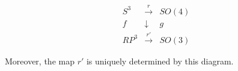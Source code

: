 $$\begin{array}{ccc}
S^3 & \xrightarrow{r} & SO(4) \\
f & \downarrow & g \\
RP^3 & \xrightarrow{r'} & SO(3)
\end{array}$$

Moreover, the map $r'$ is uniquely determined by this diagram.

